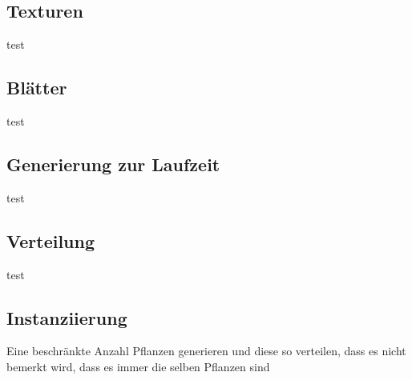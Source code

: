 \subsection{Texturen}
test
\subsection{Blätter}
test
\subsection{Generierung zur Laufzeit}
test
\subsection{Verteilung}
test
\subsection{Instanziierung}
Eine beschränkte Anzahl Pflanzen generieren und diese so verteilen, dass es nicht bemerkt wird, dass es immer die selben Pflanzen sind

